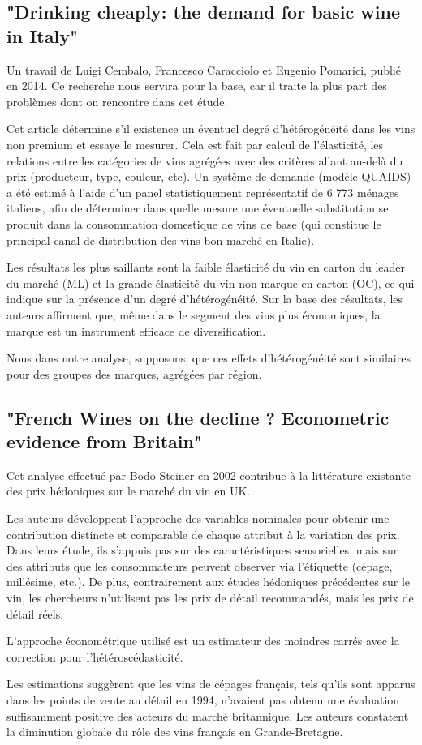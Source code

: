 \documentclass[11pt, a4paper]{article}
\begin{document}
\subsection*{"Drinking cheaply: the demand for basic wine in Italy"}
Un travail de Luigi Cembalo, Francesco Caracciolo et Eugenio Pomarici, publié en 2014.
Ce recherche nous servira pour la base, car il traite la plus part des problèmes dont on rencontre dans cet étude. 
\par
Cet article détermine s'il existence un éventuel degré d’hétérogénéité dans les vins non premium et essaye le mesurer.
Cela est fait par calcul de l’élasticité, les relations entre les catégories de vins agrégées avec des critères allant au-delà du prix (producteur, type, couleur, etc). 
Un système de demande (modèle QUAIDS) a été estimé à l'aide d'un panel statistiquement représentatif de 6 773 ménages italiens, afin de déterminer dans quelle mesure une éventuelle substitution se produit dans la consommation domestique de vins de base (qui constitue le principal canal de distribution des vins bon marché en Italie).
\par
Les résultats les plus saillants sont la faible élasticité du vin en carton du leader du marché (ML) et la grande élasticité du vin non-marque en carton (OC), ce qui indique sur la présence d'un degré d'hétérogénéité. 
Sur la base des résultats, les auteurs affirment que, même dans le segment des vins plus économiques, la marque est un instrument efficace de diversification.
\par
Nous dans notre analyse, supposons, que ces effets d'hétérogénéité sont similaires pour des groupes des marques, agrégées par région.

\subsection*{"French Wines on the decline ? Econometric evidence from Britain"}
Cet analyse effectué par Bodo Steiner en 2002 contribue à la littérature existante des prix hédoniques sur le marché du vin en UK. 
\par
Les auteurs développent l’approche des variables nominales %
pour obtenir une contribution distincte et comparable de chaque attribut à la variation des prix. 
Dans leurs étude, %
ils s'appuis pas sur des caractéristiques sensorielles, mais sur des attributs que les consommateurs peuvent observer via l'étiquette (cépage, millésime, etc.). 
De plus, contrairement aux études hédoniques précédentes sur le vin, les chercheurs n'utilisent pas les prix de détail recommandés, mais les prix de détail réels.
\par
L’approche économétrique utilisé est un estimateur des moindres carrés avec la correction pour l’hétéroscédasticité. 
\par
Les estimations suggèrent que les vins de cépages français, tels qu’ils sont apparus dans les points de vente au détail en 1994, n’avaient pas obtenu une évaluation suffisamment positive des acteurs du marché britannique. 
Les auteurs constatent la diminution globale du rôle des vins français en Grande-Bretagne.
\end{document}
